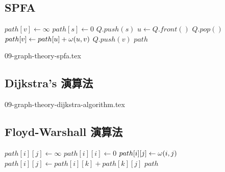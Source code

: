 \documentclass[12pt,a4paper,oneside]{report}
\begin{document}
\begin{CJK}{UTF8}{bkai}
\subsection{SPFA}
\begin{algorithm}
\caption{Shortest Path Faster Algorithm (SPFA)}
\label{algo:shortest_path_spfa}
\begin{algorithmic}[1]
  \State{}
    \State $path[v]\gets\infty$
  \EndFor
  \State $path[s]\gets{0}$
  \State $Q.push(s)$
    \State $u\gets{Q.front()}$
    \State $Q.pop()$
        \State $path[v]\gets{path[u]+\omega{\ensuremath{({u},{v})}}}$
          \State $Q.push(v)$
        \EndIf
      \EndIf
    \EndFor
  \EndWhile
  \State \Return $path$
\EndProcedure
\end{algorithmic}
\end{algorithm}

{09-graph-theory-spfa.tex}

\subsection{Dijkstra's 演算法}

{09-graph-theory-dijkstra-algorithm.tex}

\subsection{Floyd-Warshall 演算法}
\begin{algorithm}
\caption{Floyd Warshall 演算法}
\label{algo:shortest_path_floyd_warshall}
\begin{algorithmic}[1]
  \State{}
        \State $path[i][j]\gets{\infty}$
      \Else
        \State $path[i][i]\gets{0}$
      \EndIf
    \EndFor
  \EndFor
    \State $path[i][j]\gets{\omega{\ensuremath{({i},{j})}}}$
  \EndFor
          \State $path[i][j]\gets{path[i][k]+path[k][j]}$
        \EndIf
      \EndFor
    \EndFor
  \EndFor
  \State \Return $path$
\EndProcedure
\end{algorithmic}
\end{algorithm}


\end{CJK}
\end{document}
